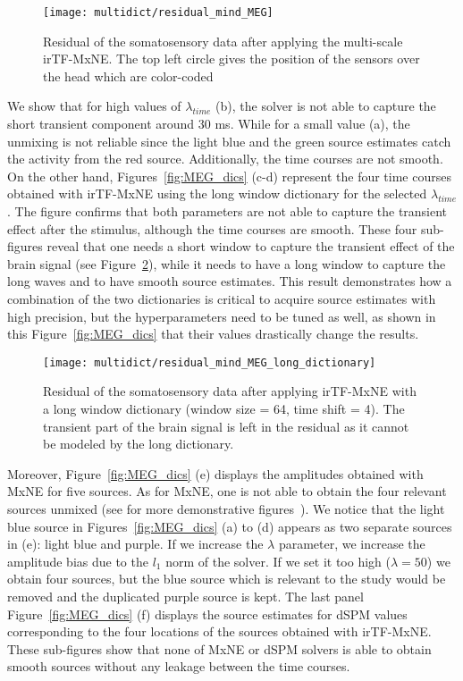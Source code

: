 \begin{figure}
\centering
	\texttt{[image: multidict/residual\_mind\_MEG]}
    \caption{Residual of the somatosensory data after applying the multi-scale irTF-MxNE. The top left circle gives the position of the sensors over the head which are color-coded}
    \label{fig:residual_mind}
\end{figure}

We show that for high values of $\lambda_{time}$ (b), the solver is not able to capture the short transient component around 30 ms. While for a small value (a), the unmixing is not reliable since the light blue and the green source estimates catch the activity from the red source. Additionally, the time courses are not smooth. On the other hand, Figures~\ref{fig:MEG_dics} (c-d) represent the four time courses obtained with irTF-MxNE using the long window dictionary for the selected $\lambda_{time}$. The figure confirms that both parameters are not able to capture the transient effect after the stimulus, although the time courses are smooth. These four sub-figures reveal that one needs a short window to capture the transient effect of the brain signal (see Figure~\ref{fig:residual_long_dic}), while it needs to have a long window to capture the long waves and to have smooth source estimates. This result demonstrates how a combination of the two dictionaries is critical to acquire source estimates with high precision, but the hyperparameters need to be tuned as well, as shown in this Figure~\ref{fig:MEG_dics} that their values drastically change the results.

\begin{figure}
\centering
	\texttt{[image: multidict/residual\_mind\_MEG\_long\_dictionary]}
    \caption{Residual of the somatosensory data after applying irTF-MxNE with a long window dictionary (window size = 64, time shift = 4). The transient part of the brain signal is left in the residual as it cannot be modeled by the long dictionary.}
    \label{fig:residual_long_dic}
\end{figure}

Moreover, Figure~\ref{fig:MEG_dics} (e) displays the amplitudes obtained with MxNE for five sources. As for MxNE, one is not able to obtain the four relevant sources unmixed (see for more demonstrative figures~\cite{gramfort2012mixed}). We notice that the light blue source in Figures~\ref{fig:MEG_dics} (a) to (d) appears as two separate sources in (e): light blue and purple. If we increase the $\lambda$ parameter, we increase the amplitude bias due to the $l_1$ norm of the solver. If we set it too high ($\lambda=50$) we obtain four sources, but the blue source which is relevant to the study would be removed and the duplicated purple source is kept. The last panel Figure~\ref{fig:MEG_dics} (f) displays the source estimates for dSPM values corresponding to the four locations of the sources obtained with irTF-MxNE. These sub-figures show that none of MxNE or dSPM solvers is able to obtain smooth sources without any leakage between the time courses.

